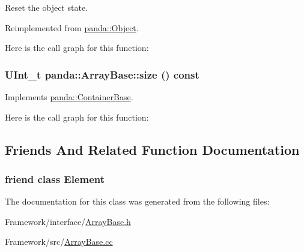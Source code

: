 Reset the object state. 

Reimplemented from \hyperlink{classpanda_1_1Object_a204960e5f165a28176f9b4a42b9ea90c}{panda::Object}.

Here is the call graph for this function:\hypertarget{classpanda_1_1ArrayBase_aecde2cb03cafd4f1ba8ef2cff0abfb4d}{
\subsubsection[{size}]{\setlength{\rightskip}{0pt plus 5cm}UInt\_\-t panda::ArrayBase::size () const}}
\label{classpanda_1_1ArrayBase_aecde2cb03cafd4f1ba8ef2cff0abfb4d}


Implements \hyperlink{classpanda_1_1ContainerBase_a4035294b020325b57cafa39fb459fd7a}{panda::ContainerBase}.

Here is the call graph for this function:

\subsection{Friends And Related Function Documentation}
\hypertarget{classpanda_1_1ArrayBase_a016b821f88c7c0a2de1451c175cefbf9}{
\subsubsection[{Element}]{\setlength{\rightskip}{0pt plus 5cm}friend class {\bf Element}}}
\label{classpanda_1_1ArrayBase_a016b821f88c7c0a2de1451c175cefbf9}


The documentation for this class was generated from the following files:\begin{DoxyCompactItemize}
\item 
Framework/interface/\hyperlink{ArrayBase_8h}{ArrayBase.h}\item 
Framework/src/\hyperlink{ArrayBase_8cc}{ArrayBase.cc}\end{DoxyCompactItemize}
